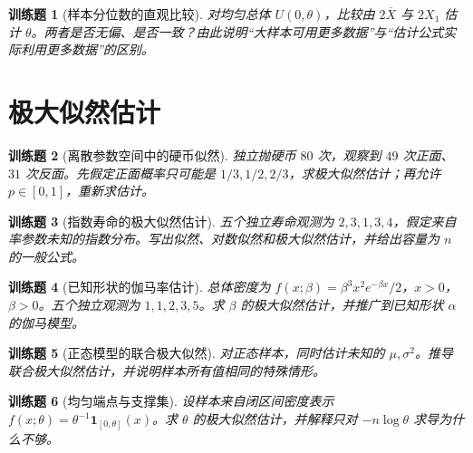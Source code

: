 \documentclass[UTF8,12pt,a4paper,fontset=fandol]{ctexbook}
\newtheorem{exercise}{训练题}[section]
\begin{document}
\begin{exercise}[样本分位数的直观比较]\label{q:B9.8}
对均匀总体 $U(0,\theta)$，比较由 $2\overline X$ 与 $2X_1$ 估计 $\theta$。两者是否无偏、是否一致？由此说明“大样本可用更多数据”与“估计公式实际利用更多数据”的区别。\par{}\end{exercise}

\clearpage\section{极大似然估计}

\begin{exercise}[离散参数空间中的硬币似然]\label{q:M-C10-1}
独立抛硬币 $80$ 次，观察到 $49$ 次正面、$31$ 次反面。先假定正面概率只可能是 $1/3,1/2,2/3$，求极大似然估计；再允许 $p\in[0,1]$，重新求估计。\par{}\end{exercise}

\begin{exercise}[指数寿命的极大似然估计]\label{q:M-C10-2}
五个独立寿命观测为 $2,3,1,3,4$，假定来自率参数未知的指数分布。写出似然、对数似然和极大似然估计，并给出容量为 $n$ 的一般公式。\par{}\end{exercise}

\begin{exercise}[已知形状的伽马率估计]\label{q:M-E2-II1}
总体密度为 $f(x;\beta)=\beta^3x^2e^{-\beta x}/2$，$x>0$，$\beta>0$。五个独立观测为 $1,1,2,3,5$。求 $\beta$ 的极大似然估计，并推广到已知形状 $\alpha$ 的伽马模型。\par{}\end{exercise}

\begin{exercise}[正态模型的联合极大似然]\label{q:B10.1}
对正态样本，同时估计未知的 $\mu,\sigma^2$。推导联合极大似然估计，并说明样本所有值相同的特殊情形。\par{}\end{exercise}

\begin{exercise}[均匀端点与支撑集]\label{q:B10.2}
设样本来自闭区间密度表示 $f(x;\theta)=\theta^{-1}\mathbf1_{[0,\theta]}(x)$。求 $\theta$ 的极大似然估计，并解释只对 $-n\log\theta$ 求导为什么不够。\par{}\end{exercise}
\end{document}
